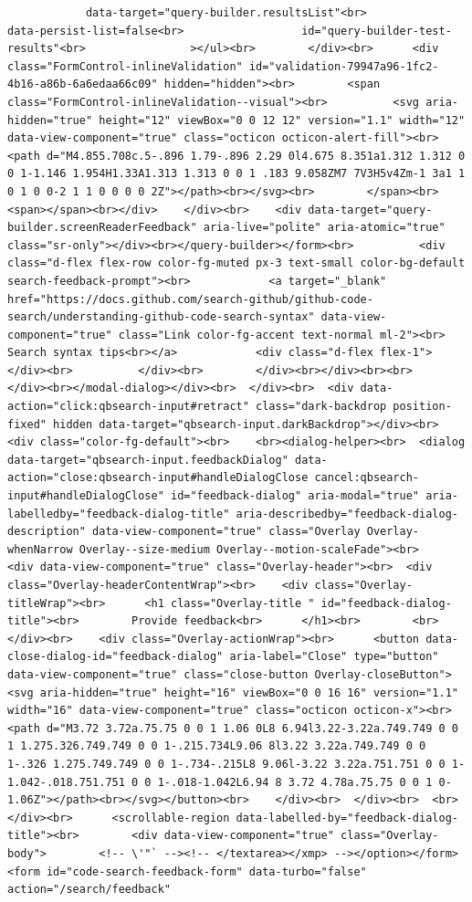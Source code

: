 \documentclass[
  letterpaper,
]{book}
\begin{document}
\begin{verbatim}
            data-target="query-builder.resultsList"<br>                  data-persist-list=false<br>                  id="query-builder-test-results"<br>                ></ul><br>        </div><br>      <div class="FormControl-inlineValidation" id="validation-79947a96-1fc2-4b16-a86b-6a6edaa66c09" hidden="hidden"><br>        <span class="FormControl-inlineValidation--visual"><br>          <svg aria-hidden="true" height="12" viewBox="0 0 12 12" version="1.1" width="12" data-view-component="true" class="octicon octicon-alert-fill"><br>    <path d="M4.855.708c.5-.896 1.79-.896 2.29 0l4.675 8.351a1.312 1.312 0 0 1-1.146 1.954H1.33A1.313 1.313 0 0 1 .183 9.058ZM7 7V3H5v4Zm-1 3a1 1 0 1 0 0-2 1 1 0 0 0 0 2Z"></path><br></svg><br>        </span><br>        <span></span><br></div>    </div><br>    <div data-target="query-builder.screenReaderFeedback" aria-live="polite" aria-atomic="true" class="sr-only"></div><br></query-builder></form><br>          <div class="d-flex flex-row color-fg-muted px-3 text-small color-bg-default search-feedback-prompt"><br>            <a target="_blank" href="https://docs.github.com/search-github/github-code-search/understanding-github-code-search-syntax" data-view-component="true" class="Link color-fg-accent text-normal ml-2"><br>              Search syntax tips<br></a>            <div class="d-flex flex-1"></div><br>          </div><br>        </div><br></div><br><br>    </div><br></modal-dialog></div><br>  </div><br>  <div data-action="click:qbsearch-input#retract" class="dark-backdrop position-fixed" hidden data-target="qbsearch-input.darkBackdrop"></div><br>  <div class="color-fg-default"><br>    <br><dialog-helper><br>  <dialog data-target="qbsearch-input.feedbackDialog" data-action="close:qbsearch-input#handleDialogClose cancel:qbsearch-input#handleDialogClose" id="feedback-dialog" aria-modal="true" aria-labelledby="feedback-dialog-title" aria-describedby="feedback-dialog-description" data-view-component="true" class="Overlay Overlay-whenNarrow Overlay--size-medium Overlay--motion-scaleFade"><br>    <div data-view-component="true" class="Overlay-header"><br>  <div class="Overlay-headerContentWrap"><br>    <div class="Overlay-titleWrap"><br>      <h1 class="Overlay-title " id="feedback-dialog-title"><br>        Provide feedback<br>      </h1><br>        <br>    </div><br>    <div class="Overlay-actionWrap"><br>      <button data-close-dialog-id="feedback-dialog" aria-label="Close" type="button" data-view-component="true" class="close-button Overlay-closeButton"><svg aria-hidden="true" height="16" viewBox="0 0 16 16" version="1.1" width="16" data-view-component="true" class="octicon octicon-x"><br>    <path d="M3.72 3.72a.75.75 0 0 1 1.06 0L8 6.94l3.22-3.22a.749.749 0 0 1 1.275.326.749.749 0 0 1-.215.734L9.06 8l3.22 3.22a.749.749 0 0 1-.326 1.275.749.749 0 0 1-.734-.215L8 9.06l-3.22 3.22a.751.751 0 0 1-1.042-.018.751.751 0 0 1-.018-1.042L6.94 8 3.72 4.78a.75.75 0 0 1 0-1.06Z"></path><br></svg></button><br>    </div><br>  </div><br>  <br></div><br>      <scrollable-region data-labelled-by="feedback-dialog-title"><br>        <div data-view-component="true" class="Overlay-body">        <!-- \'"` --><!-- </textarea></xmp> --></option></form><form id="code-search-feedback-form" data-turbo="false" action="/search/feedback" 
\end{verbatim}
\end{document}
